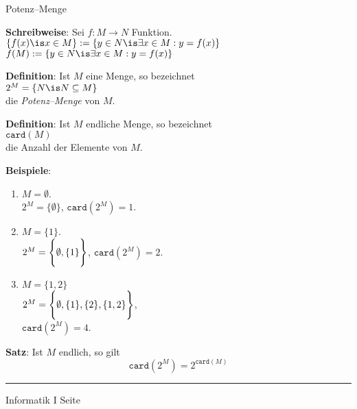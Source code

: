 
\begin{slide}{}
\normalsize
\begin{center}
Potenz--Menge
\end{center}
\vspace{0.5cm}

\footnotesize
\textbf{Schreibweise}: Sei $f: M \rightarrow N$ Funktion.  \\[0.3cm]
\hspace*{1.3cm} $\{ f(x) \is x \in M \} := \{ y \in N \is \exists x \in M: y = f(x) \}$ \\[0.3cm]
\hspace*{3.9cm} $f(M) := \{ y \in N \is \exists x \in M: y = f(x) \}$

\footnotesize
\textbf{Definition}: Ist $M$ eine Menge, so bezeichnet \\[0.3cm]
\hspace*{1.3cm} $2^M = \{ N \is N \subseteq M \}$ \\[0.3cm]
die \emph{Potenz--Menge} von $M$.
\vspace{0.5cm}

\textbf{Definition}: Ist $M$ endliche Menge, so bezeichnet \\[0.3cm]
\hspace*{1.3cm} $\mathtt{card}(M)$ \\[0.3cm]
die Anzahl der Elemente von $M$.

\textbf{Beispiele}:
\begin{enumerate}
\item $M = \emptyset$. \\[0.3cm]
      \hspace*{1.3cm} $2^M = \{ \emptyset \}$, \quad $\mathtt{card}(2^M) = 1$.
\item $M = \{1\}$. \\[0.3cm]
      \hspace*{1.3cm} $2^M = \left\{ \emptyset, \{1\} \rule{0pt}{16pt} \right\}$, \quad $\mathtt{card}(2^M) = 2$.
\item $M = \{1,2\}$ \\[0.3cm]
      \hspace*{1.3cm} $2^M = \left\{ \emptyset, \{1\}, \{2\}, \{1,2\} \rule{0pt}{16pt} \right\}$, \\[0.3cm]
      \hspace*{1.3cm} $\mathtt{card}(2^M) = 4$.
\end{enumerate}
\vspace{0.5cm}

\textbf{Satz}: Ist $M$ endlich, so gilt 
$$\mathtt{card}(2^M) = 2^{\mathtt{card}(M)}$$

\vspace*{\fill}
\tiny \addtocounter{mypage}{1}
\rule{15cm}{1mm}
Informatik I  \hspace*{\fill} Seite 
\end{slide}

